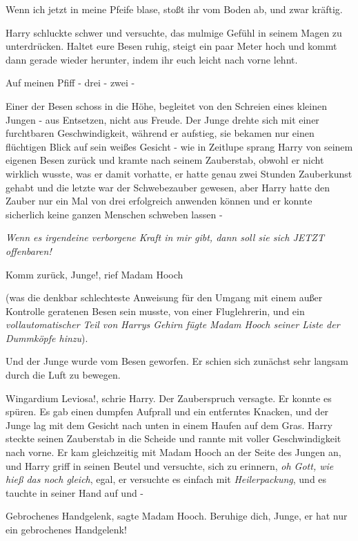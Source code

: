\glqq Wenn ich jetzt in meine Pfeife blase, stoßt ihr vom Boden ab, und zwar
kräftig.\grqq{}

Harry schluckte schwer und versuchte, das mulmige Gefühl in seinem Magen zu
unterdrücken. \glqq Haltet eure Besen ruhig, steigt ein paar Meter hoch und
kommt dann gerade wieder herunter, indem ihr euch leicht nach vorne lehnt.

Auf meinen Pfiff - drei - zwei -\grqq{}

Einer der Besen schoss in die Höhe, begleitet von den Schreien eines kleinen
Jungen - aus Entsetzen, nicht aus Freude. Der Junge drehte sich mit einer
furchtbaren Geschwindigkeit, während er aufstieg, sie bekamen nur einen
flüchtigen Blick auf sein weißes Gesicht - wie in Zeitlupe sprang Harry von
seinem eigenen Besen zurück und kramte nach seinem Zauberstab, obwohl er nicht
wirklich wusste, was er damit vorhatte, er hatte genau zwei Stunden Zauberkunst
gehabt und die letzte war der Schwebezauber gewesen, aber Harry hatte den Zauber
nur ein Mal von drei erfolgreich anwenden können und er konnte sicherlich keine
ganzen Menschen schweben lassen -

\emph{Wenn es irgendeine verborgene Kraft in mir gibt, dann soll sie sich JETZT
offenbaren!}

\glqq Komm zurück, Junge!\grqq{}, rief Madam Hooch

(was die denkbar schlechteste Anweisung für den Umgang mit einem außer Kontrolle
geratenen Besen sein musste, von einer Fluglehrerin, und ein
\emph{vollautomatischer Teil von Harrys Gehirn fügte Madam Hooch seiner Liste
der Dummköpfe hinzu}).

Und der Junge wurde vom Besen geworfen. Er schien sich zunächst sehr langsam
durch die Luft zu bewegen.

\glqq Wingardium Leviosa!\grqq{}, schrie Harry. Der Zauberspruch versagte. Er
konnte es spüren. Es gab einen dumpfen Aufprall und ein entferntes Knacken, und
der Junge lag mit dem Gesicht nach unten in einem Haufen auf dem Gras. Harry
steckte seinen Zauberstab in die Scheide und rannte mit voller Geschwindigkeit
nach vorne. Er kam gleichzeitig mit Madam Hooch an der Seite des Jungen an, und
Harry griff in seinen Beutel und versuchte, sich zu erinnern, \emph{oh Gott, wie
hieß das noch gleich}, egal, er versuchte es einfach mit \glqq
\emph{Heilerpackung}\grqq{}, und es tauchte in seiner Hand auf und -

\glqq Gebrochenes Handgelenk\grqq{}, sagte Madam Hooch. \glqq Beruhige dich,
Junge, er hat nur ein gebrochenes Handgelenk!\grqq{}

